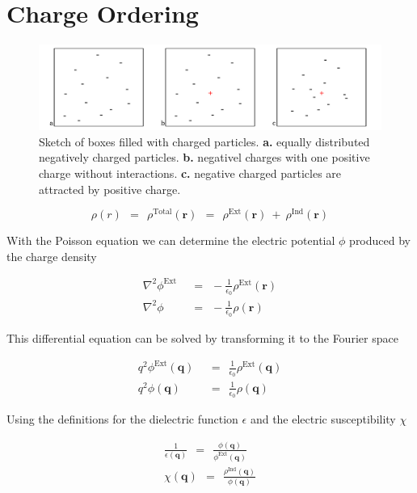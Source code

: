 \documentclass[10pt]{report}
\numberwithin{equation}{chapter}
\begin{document}
\section{Charge Ordering}

\begin{figure}
  \centering
  \includegraphics[width=1.0\textwidth]{../img/screening_charge_box.pdf}
  \caption{Sketch of boxes filled with charged particles. \textbf{a.} equally distributed negatively charged particles. \textbf{b.} negativel charges with one positive charge without interactions. \textbf{c.} negative charged particles are attracted by positive charge.}
  \label{fig:screening_charge_box}
\end{figure}

\begin{equation} \label{eq:tot_charge_dens}
  \rho(r) ~~=~~ \rho^\text{Total}(\mathbf{r}) ~~=~~ \rho^\text{Ext}(\mathbf{r}) ~+~ \rho^\text{Ind}(\mathbf{r})
\end{equation}


With the Poisson equation we can determine the electric potential $\phi$ produced by the charge density

\begin{align}
  \nabla^2 \phi^\text{Ext} ~~& =~~ -\frac{1}{\epsilon_0} \rho^\text{Ext}(\mathbf{r}) \\
  \nabla^2 \phi	~~& =~~ -\frac{1}{\epsilon_0} \rho(\mathbf{r})
\end{align}


This differential equation can be solved by transforming it to the Fourier space

\begin{align}
  q^2 \phi^\text{Ext}(\mathbf{q}) ~~& =~~ \frac{1}{\epsilon_0} \rho^\text{Ext}(\mathbf{q}) \\
  q^2 \phi (\mathbf{q}) ~~&=~~ \frac{1}{\epsilon_0}  \rho(\mathbf{q})
\end{align}


Using the definitions for the dielectric function $\epsilon$ and the electric susceptibility $\chi$

\begin{align}  \label{eq:screen_dielect}
  \frac{1}{\epsilon(\mathbf{q})} ~~=~~ \frac{\phi(\mathbf{q})}{\phi^\text{Ext}(\mathbf{q})} \\
  \label{eq:screen_suscept}
  \chi(\mathbf{q}) ~~=~~ \frac{\rho^\text{Ind}(\mathbf{q})}{\phi(\mathbf{q})}
\end{align}
\end{document}
